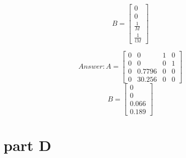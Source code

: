 \documentclass[a4paper,11pt]{article}
\makeatletter
\newcommand{\problemquestion}[1]{\gdef\@problemquestion{#1}}%
\newcommand{\problemsolution}[1]{\gdef\@problemsolution{#1}}%
\theoremstyle{mytheor}
\makeatother
\begin{document}
\begin{problem}
{$$B =\begin{bmatrix} 0 \\ 0 \\ \frac{1}{M} \\ \frac{1}{lM} \end{bmatrix}$$

$$Answer: A = \begin{bmatrix} 0&0&1&0\\ 0&0&0&1 \\ 0&0.7796&0&0\\ 0&30.256&0&0\end{bmatrix} $$
$$B =\begin{bmatrix} 0 \\ 0 \\ 0.066 \\ 0.189 \end{bmatrix}$$

}
\end{problem}


\section*{part D}
\begin{problem}
  \problemquestion{Check stability of the linearized system using any method you like;}
  \problemsolution{Find the eighen-values of A matrix:
$$det(\begin{bmatrix} -\lambda&0&1&0\\ 0&-\lambda&0&1 \\ 0&\frac{gm}{M}&-\lambda&0\\ 0&\frac{g(M+m)}{lM}&0&-\lambda\end{bmatrix}) = -\lambda(-\lambda^3 + \lambda\frac{g(M+m)}{lm}) = $$
$$\lambda^4-\lambda^2(\frac{gM+m}{lM}) = 0$$

$$\lambda = 0$$
$$\lambda = \sqrt{\frac{g(M+m)}{lM}} $$
$$\lambda = -\sqrt{\frac{g(M+m)}{lM}}$$


$$\lambda = \sqrt{\frac{9.81(16.3)}{5.285}} $$
$$\lambda = -\sqrt{\frac{9.81(16.3)}{5.285}}$$

$$\lambda = 5.5005461 $$
$$\lambda = -5.5005461 $$

$Answer:$ Thus there exist lambda with module that greater than zero => system without control is not stable}
\end{problem}
\end{document}
